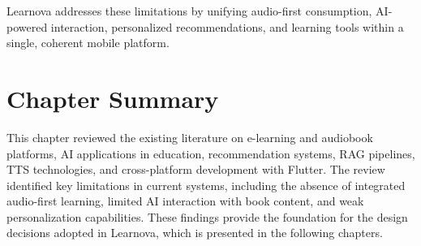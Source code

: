 Learnova addresses these limitations by unifying audio-first consumption,
AI-powered interaction, personalized recommendations, and learning tools
within a single, coherent mobile platform.

\section*{Chapter Summary}

This chapter reviewed the existing literature on e-learning and audiobook
platforms, AI applications in education, recommendation systems, RAG
pipelines, TTS technologies, and cross-platform development with Flutter.
The review identified key limitations in current systems, including the
absence of integrated audio-first learning, limited AI interaction with
book content, and weak personalization capabilities. These findings provide
the foundation for the design decisions adopted in Learnova, which is
presented in the following chapters.